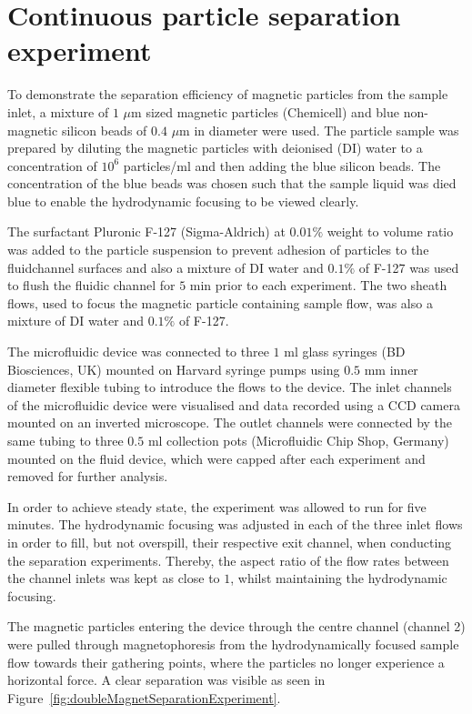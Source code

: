 \section{Continuous particle separation experiment}\label{sec:continuousParticleSeparationExperiment}
To demonstrate the separation efficiency of magnetic particles from the sample inlet, a mixture of $1$ $\mu$m sized magnetic particles (Chemicell) and blue non-magnetic silicon beads of $0.4$ $\mu$m in diameter were used. The particle sample was prepared by diluting the magnetic particles with deionised (DI) water to a concentration of $10^{6}$ particles/ml and then adding the blue silicon beads. The concentration of the blue beads was chosen such that the sample liquid was died blue to enable the hydrodynamic focusing to be viewed clearly.

The surfactant Pluronic F-127 (Sigma-Aldrich) at $0.01 \%$ weight to volume ratio was added to the particle suspension to prevent adhesion of particles to the fluidchannel surfaces and also a mixture of DI water and $0.1 \%$ of F-127 was used to flush the fluidic channel for $5$ min prior to each experiment. The two sheath flows, used to focus the magnetic particle containing sample flow, was also a mixture of DI water and $0.1 \%$ of F-127.

The microfluidic device was connected to three $1$ ml glass syringes (BD Biosciences, UK) mounted on Harvard syringe pumps using $0.5$ mm inner diameter flexible tubing to introduce the flows to the device. The inlet channels of the microfluidic device were visualised and data recorded using a CCD camera mounted on an inverted microscope. The outlet channels were connected by the same tubing to three $0.5$ ml collection pots (Microfluidic Chip Shop, Germany) mounted on the fluid device, which were capped after each experiment and removed for further analysis. 

In order to achieve steady state, the experiment was allowed to run for five minutes. The hydrodynamic focusing was adjusted in each of the three inlet flows in order to fill, but not overspill, their respective exit channel, when conducting the separation experiments. Thereby, the aspect ratio of the flow rates between the channel inlets was kept as close to $1$, whilst maintaining the hydrodynamic focusing.  

The magnetic particles entering the device through the centre channel (channel 2) were pulled through magnetophoresis from the hydrodynamically focused sample flow towards their gathering points, where the particles no longer experience a horizontal force. A clear separation was visible as seen in Figure~\ref{fig:doubleMagnetSeparationExperiment}.

